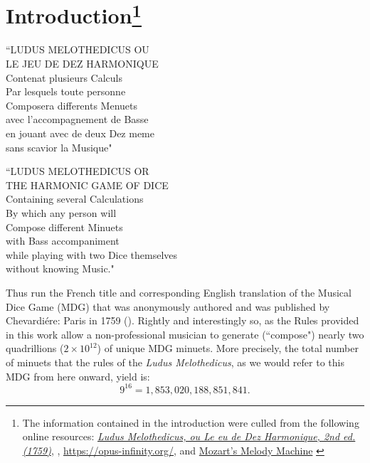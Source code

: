 \documentclass[a4paper,x11names,svgnames,10pt]{article}
\begin{document}
{\section[Introduction]{Introduction\footnote{The information contained in the introduction were culled from the following online resources:
	\href{https://imslp.org/wiki/Ludus_Melothedicus_(Anonymous)}{\it Ludus Melothedicus, ou Le eu de Dez Harmonique, 2nd ed. (1759)}, 
	\citet{wiki_mw2017},
	\url{https://opus-infinity.org/}, and 
	\href{https://www.sciencenews.org/article/mozarts-melody-machine-0}{Mozart's Melody Machine} \citep*{peterson2001}
	}
}
	\begin{center}
	\begin{minipage}{0.4\textwidth}
	\begin{flushleft}
		\begin{center}
			``\small LUDUS MELOTHEDICUS OU \\ LE JEU DE DEZ HARMONIQUE \\
			Contenat plusieurs Calculs \\
			Par lesquels toute personne \\ Composera differents Menuets \\ 
			avec l'accompagnement de Basse  \\
			en jouant avec de deux Dez meme  \\
			sans scavior la Musique"
		\end{center}
	\end{flushleft}
	\end{minipage}
	\begin{minipage}{0.4\textwidth}
	\begin{flushright}
		\begin{center}
		``\small LUDUS MELOTHEDICUS OR \\ THE HARMONIC GAME OF DICE \\
		Containing several Calculations \\ 
		By which any person will \\
		Compose different Minuets \\ 
		with Bass accompaniment \\
		while playing with two Dice themselves \\ 
		without knowing Music."
	\end{center}
	\end{flushright}
	\end{minipage}
	\end{center}

Thus run the French title and corresponding English translation of the Musical Dice Game (MDG) that was anonymously authored and was published by Chevardi\'{e}re: Paris in 1759 (\citealp{ludus1759}).  Rightly and interestingly so, as the Rules provided in this work allow a non-professional musician to generate (``compose") nearly two quadrillions ($2 \times 10^{12}$) of unique MDG minuets.  More precisely, the total number of minuets that the rules of the {\it Ludus Melothedicus}, as we would refer to this MDG from here onward, yield is: $$9^{16} = 1\!,853\!,020\!,188\!,851\!,841.$$ 

}
\end{document}
